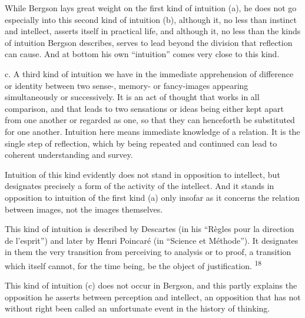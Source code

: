 \documentclass[12pt,a4paper,openany]{book}
\newcommand{\opage}[1]{\marginnote{\footnotesize\textit{[#1]}}}
\newcommand{\nm}[1]{\unskip\textsuperscript{#1}}
\begin{document}
While Bergson lays great weight on the first kind of intuition (a), he does not go especially into this second kind of intuition (b), although it, no less than instinct and intellect, asserts itself in practical life, and although it, no less than the kinds of intuition Bergson describes, serves to lead beyond the division that reflection can cause. And at bottom his own ``intuition'' comes very close to this kind.

c. A third kind of intuition we have in the immediate apprehension of difference or identity between two sense-, memory- or fancy-images appearing simultaneously or successively. It is an act of thought that works in all comparison, and that leads to two sensations or ideas being either kept apart from one another or regarded as one, so that they
\opage{24}can henceforth be substituted for one another. Intuition here means immediate knowledge of a relation. It is the single step of reflection, which by being repeated and continued can lead to coherent understanding and survey.

Intuition of this kind evidently does not stand in opposition to intellect, but designates precisely a form of the activity of the intellect. And it stands in opposition to intuition of the first kind (a) only insofar as it concerns the relation between images, not the images themselves.

This kind of intuition is described by Descartes (in his ``Règles pour la direction de l'esprit'') and later by Henri Poincaré (in ``Science et Méthode''). It designates in them the very transition from perceiving to analysis or to proof, a transition which itself cannot, for the time being, be the object of justification. \nm{18}

This kind of intuition (c) does not occur in Bergson, and this partly explains the opposition he asserts between perception and intellect, an opposition that has not without right been called an unfortunate event in the history of thinking.
\end{document}
